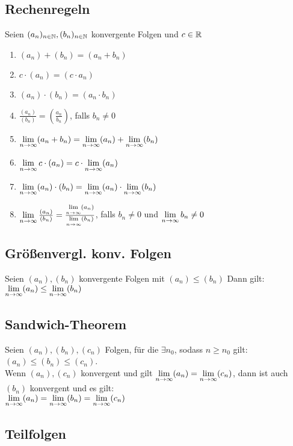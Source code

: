 \subsection*{Rechenregeln}
Seien $(a_n)_{n \in \mathbb N}, (b_n)_{n \in \mathbb N}$ konvergente Folgen und $c\in \mathbb R$
\begin{enumerate}[label=\alph*., noitemsep]
    \item $(a_n) + (b_n) = (a_n + b_n)$
    \item $c \cdot (a_n) = (c \cdot a_n)$
    \item $(a_n) \cdot (b_n) = (a_n \cdot b_n)$
    \item $\frac{(a_n)}{(b_n)} = \left( \frac{a_n}{b_n} \right)$, falls $b_n \neq 0$
    \item $\lim\limits_{n \rightarrow \infty} (a_n + b_n) = \lim\limits_{n \rightarrow \infty} (a_n) + \lim\limits_{n \rightarrow \infty} (b_n)$
    \item $\lim\limits_{n \rightarrow \infty} c \cdot (a_n) = c \cdot \lim\limits_{n \rightarrow \infty} (a_n)$
    \item $\lim\limits_{n \rightarrow \infty} (a_n) \cdot (b_n) = \lim\limits_{n \rightarrow \infty} (a_n) \cdot \lim\limits_{n \rightarrow \infty} (b_n)$
    \item $\lim\limits_{n \rightarrow \infty} \frac{(a_n)}{(b_n)} = \frac{\lim\limits_{n \rightarrow \infty} (a_n)}{\lim\limits_{n \rightarrow \infty} (b_n)}$, falls $b_n \neq 0$ und $\lim\limits_{n \rightarrow \infty} b_n \neq 0$
\end{enumerate}
\subsection*{Größenvergl. konv. Folgen}
Seien $(a_n), (b_n)$ konvergente Folgen mit $(a_n) \leq (b_n)$ Dann gilt: $\lim\limits_{n \rightarrow \infty} (a_n) \leq \lim\limits_{n \rightarrow \infty} (b_n)$
\subsection*{Sandwich-Theorem}
Seien $(a_n), (b_n), (c_n)$ Folgen, für die $\exists n_0$, sodass $n \geq n_0$ gilt: $(a_n) \leq (b_n) \leq (c_n)$.\\
Wenn $(a_n), (c_n)$ konvergent und gilt $\lim\limits_{n \rightarrow \infty} (a_n) = \lim\limits_{n \rightarrow \infty} (c_n)$, dann ist auch $(b_n)$ konvergent und es gilt:\\
$\lim\limits_{n \rightarrow \infty} (a_n) = \lim\limits_{n \rightarrow \infty} (b_n) = \lim\limits_{n \rightarrow \infty} (c_n)$
\subsection*{Teilfolgen}
